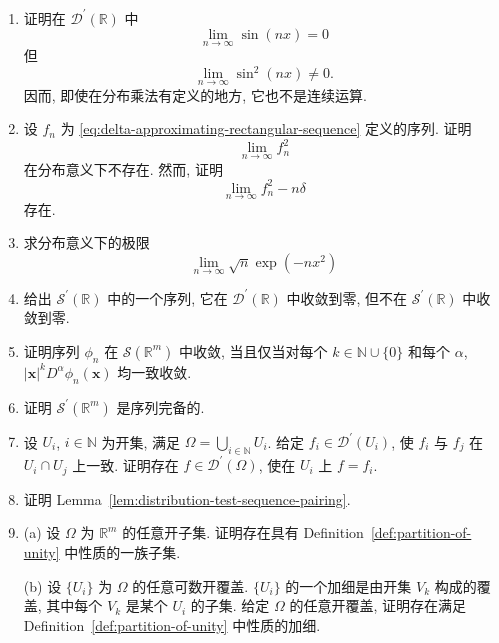 \begin{enumerate}[label=\thesection.\arabic*.,ref=\thesection.\arabic*,start=1,series=book-problems]
\item\label{ex:distribution-multiplication-not-continuous} 证明在 $\mathcal{D}^{\prime}(\mathbb{R})$ 中 \[\lim_{n\to\infty}\sin(nx)=0\] 但 \[\lim_{n\to\infty}\sin^2(nx)\ne0.\] 因而, 即使在分布乘法有定义的地方, 它也不是连续运算.

\item\label{ex:delta-approximation-square-divergence} 设 $f_n$ 为 \eqref{eq:delta-approximating-rectangular-sequence} 定义的序列. 证明 \[\lim_{n\to\infty}f_n^2\] 在分布意义下不存在. 然而, 证明 \[\lim_{n\to\infty}f_n^2-n\delta\] 存在.

\item\label{ex:gaussian-distribution-limit} 求分布意义下的极限 \[\lim_{n\to\infty}\sqrt n\exp(-nx^2)\]

\item\label{ex:distribution-not-tempered-convergence} 给出 $\mathcal{S}^{\prime}(\mathbb{R})$ 中的一个序列, 它在 $\mathcal{D}^{\prime}(\mathbb{R})$ 中收敛到零, 但不在 $\mathcal{S}^{\prime}(\mathbb{R})$ 中收敛到零.

\item\label{ex:rapid-tests-weighted-uniform-convergence} 证明序列 $\phi_n$ 在 $\mathcal{S}(\mathbb{R}^m)$ 中收敛, 当且仅当对每个 $k\in\mathbb{N}\cup\{0\}$ 和每个 $\alpha$, $|\bm{x}|^kD^\alpha\phi_n(\bm{x})$ 均一致收敛.

\item\label{ex:tempered-distributions-sequential-completeness} 证明 $\mathcal{S}^{\prime}(\mathbb{R}^m)$ 是序列完备的.

\item\label{ex:distribution-gluing-open-cover} 设 $U_i$, $i\in\mathbb{N}$ 为开集, 满足 $\Omega=\bigcup_{i\in\mathbb{N}}U_i$. 给定 $f_i\in\mathcal{D}^{\prime}(U_i)$, 使 $f_i$ 与 $f_j$ 在 $U_i\cap U_j$ 上一致. 证明存在 $f\in\mathcal{D}^{\prime}(\Omega)$, 使在 $U_i$ 上 $f=f_i$.

\item\label{ex:distribution-test-sequence-pairing} 证明 Lemma~\ref{lem:distribution-test-sequence-pairing}.

\item\label{ex:locally-finite-cover-refinement} (a) 设 $\Omega$ 为 $\mathbb{R}^m$ 的任意开子集. 证明存在具有 Definition~\ref{def:partition-of-unity} 中性质的一族子集.

(b) 设 $\{U_i\}$ 为 $\Omega$ 的任意可数开覆盖. $\{U_i\}$ 的一个加细是由开集 $V_k$ 构成的覆盖, 其中每个 $V_k$ 是某个 $U_i$ 的子集. 给定 $\Omega$ 的任意开覆盖, 证明存在满足 Definition~\ref{def:partition-of-unity} 中性质的加细.

\end{enumerate}
